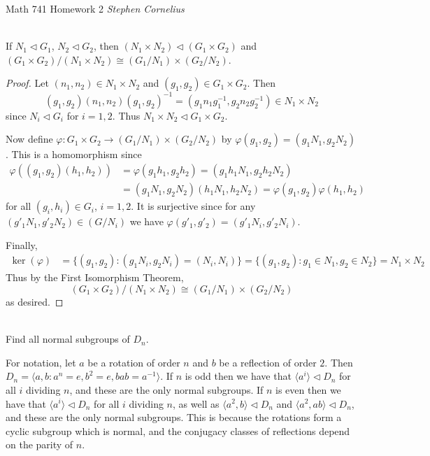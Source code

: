 \documentclass{article}
\begin{document}
\begin{center}
    Math 741
    \hfill Homework 2
    \hfill \textit{Stephen Cornelius}
\end{center}

\begin{problem}[Exercise 1.5.14] \\
    If $N_1 \triangleleft G_1$, $N_2 \triangleleft G_2$, then $(N_1 \times N_2) \triangleleft (G_1 \times G_2)$ and $(G_1 \times G_2)/(N_1 \times N_2) \cong (G_1/N_1) \times (G_2/N_2)$.
\end{problem}

\begin{proof}
    Let $(n_1, n_2) \in N_1 \times N_2$ and $(g_1, g_2) \in G_1 \times G_2$. Then
    \[
        (g_1, g_2)(n_1, n_2)(g_1, g_2)^{-1} = (g_1 n_1 g_1^{-1}, g_2 n_2 g_2^{-1}) \in N_1 \times N_2
    \]
    since $N_i \triangleleft G_i$ for $i = 1, 2$. Thus $N_1 \times N_2 \triangleleft G_1 \times G_2$.

    Now define $\varphi: G_1 \times G_2 \to (G_1/N_1) \times (G_2/N_2)$ by $\varphi(g_1, g_2) = (g_1 N_1, g_2 N_2)$. This is a homomorphism since
    \begin{align*}
        \varphi((g_1, g_2)(h_1, h_2)) &= \varphi(g_1 h_1, g_2 h_2) = (g_1 h_1 N_1, g_2 h_2 N_2) \\
        &= (g_1 N_1, g_2 N_2)(h_1 N_1, h_2 N_2) = \varphi(g_1, g_2)\varphi(h_1, h_2)
    \end{align*}
    for all $(g_i, h_i) \in G_i$, $i = 1, 2$. It is surjective since for any $(g'_1 N_1, g'_2 N_2) \in (G/N_i)$ we have $\varphi(g'_1, g'_2) = (g'_1 N_i, g'_2 N_i)$.

    Finally,
    \begin{align*}
        \ker(\varphi) &= \{(g_1, g_2) : (g_1 N_i, g_2 N_i) = (N_i, N_i)\} = \{(g_1, g_2) : g_1 \in N_1, g_2 \in N_2\} = N_1 \times N_2
    \end{align*}
    Thus by the First Isomorphism Theorem,
    \[
        (G_1 \times G_2)/(N_1 \times N_2) \cong (G_1/N_1) \times (G_2/N_2)
    \]
    as desired.
\end{proof}



\begin{problem}[1.6.11] \\ 
    Find all normal subgroups of $D_n$.
\end{problem}

For notation, let $a$ be a rotation of order $n$ and $b$ be a reflection of order $2$. Then $D_n = \langle a, b : a^n = e, b^2 = e, bab = a^{-1} \rangle$. If $n$ is odd then we have that $\langle a^i \rangle \triangleleft D_n$ for all $i$ dividing $n$, and these are the only normal subgroups. If $n$ is even then we have that $\langle a^i \rangle \triangleleft D_n$ for all $i$ dividing $n$, as well as $\langle a^2, b \rangle \triangleleft D_n$ and $\langle a^2, ab \rangle \triangleleft D_n$, and these are the only normal subgroups. This is because the rotations form a cyclic subgroup which is normal, and the conjugacy classes of reflections depend on the parity of $n$.
\end{document}
